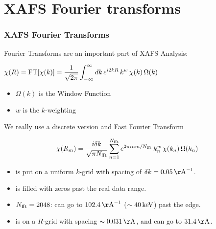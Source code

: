 \section{XAFS Fourier transforms}

\begin{frame} \frametitle{XAFS Fourier Transforms}

\begin{cenpage}{130mm}
Fourier Transforms are an important part of XAFS Analysis:

\begin{postitbox}{75mm}  $\displaystyle{ \chi(R) = {\rm FT}[\chi(k)] =
  \frac{1}{\sqrt{2\pi}}
  \int_{-\infty}^{\infty} { dk \, e^{i2kR} \, k^w \, \chi(k) \, \Omega(k) }} $
\end{postitbox}

\begin{itemize}
\item $\Omega(k)$ is the Window Function
\item $w$ is the $k$-weighting
\end{itemize}

\pause
\vmm
 We really use a discrete version and Fast Fourier Transform

\[
\chi(R_m) = \frac{i \delta k}{\sqrt{\pi N_{\rm fft}}}
\sum_{n=1}^{N_{\rm fft}}
e^{2\pi i n m/N_{\rm fft}} \,  k_n^w \, \chi(k_n)\, \Omega(k_n)
\]

\pause
\begin{itemize}
\item {\chik} is put on a uniform $k$-grid with spacing of  $\delta k=0.05
  {\rm\,  \AA}^{-1}$.
\item {\chik} is filled with zeros past the real data range.

\item $N_{\rm fft} = 2048$: {\chik} can go to $102.4 {\rm\, \AA}^{-1}$
  ($\sim 40\rm \, keV$) past the edge.

\item {\chir} is on a $R$-grid with spacing $\sim0.031\,\rm\AA$, and can
  go to $31.4 \,\rm\AA$.
\end{itemize}
\end{cenpage}

\end{frame}

